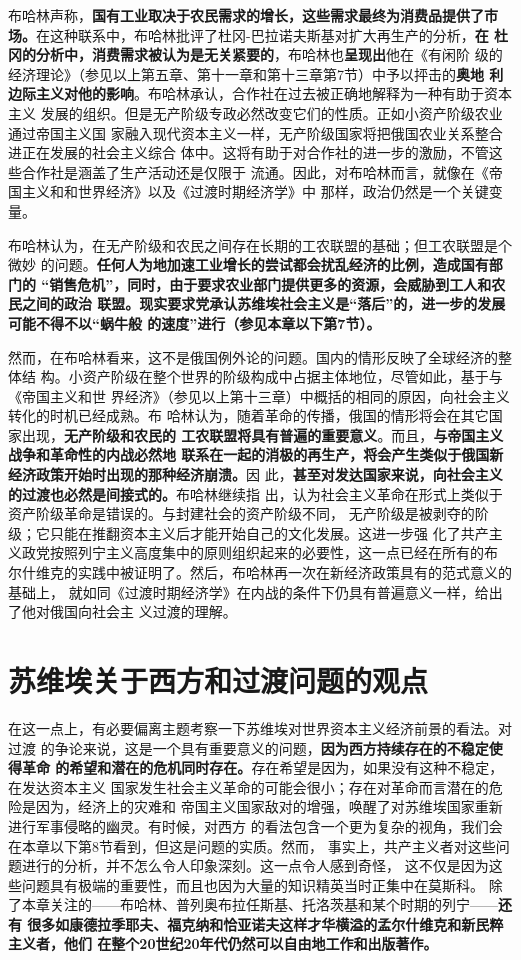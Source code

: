 布哈林声称，\textbf{国有工业取决于农民需求的增长，这些需求最终为消费品提供了市
  场。}在这种联系中，布哈林批评了杜冈-巴拉诺夫斯基对扩大再生产的分析，\textbf{在
  杜冈的分析中，消费需求被认为是无关紧要的}，布哈林也\textbf{呈现出}他在《有闲阶
级的经济理论》（参见以上第五章、第十一章和第十三章第7节）中予以抨击的\textbf{奥地
  利边际主义对他的影响}。布哈林承认，合作社在过去被正确地解释为一种有助于资本主义
发展的组织。但是无产阶级专政必然改变它们的性质。正如小资产阶级农业通过帝国主义国
家融入现代资本主义一样，无产阶级国家将把俄国农业关系整合进正在发展的社会主义综合
体中。这将有助于对合作社的进一步的激励，不管这些合作社是涵盖了生产活动还是仅限于
流通。因此，对布哈林而言，就像在《帝国主义和和世界经济》以及《过渡时期经济学》中
那样，政治仍然是一个关键变量。

布哈林认为，在无产阶级和农民之间存在长期的工农联盟的基础；但工农联盟是个微妙
的问题。\textbf{任何人为地加速工业增长的尝试都会扰乱经济的比例，造成国有部门的
“销售危机”，同时，由于要求农业部门提供更多的资源，会威胁到工人和农民之间的政治
联盟。现实要求党承认苏维埃社会主义是“落后”的，进一步的发展可能不得不以“蜗牛般
的速度”进行（参见本章以下第7节）。}

然而，在布哈林看来，这不是俄国例外论的问题。国内的情形反映了全球经济的整体结
构。小资产阶级在整个世界的阶级构成中占据主体地位，尽管如此，基于与《帝国主义和世
界经济》（参见以上第十三章）中概括的相同的原因，向社会主义转化的时机已经成熟。布
哈林认为，随着革命的传播，俄国的情形将会在其它国家出现，\textbf{无产阶级和农民的
工农联盟将具有普遍的重要意义}。而且，\textbf{与帝国主义战争和革命性的内战必然地
联系在一起的消极的再生产，将会产生类似于俄国新经济政策开始时出现的那种经济崩溃。}因
此，\textbf{甚至对发达国家来说，向社会主义的过渡也必然是间接式的。}布哈林继续指
出，认为社会主义革命在形式上类似于资产阶级革命是错误的。与封建社会的资产阶级不同，
无产阶级是被剥夺的阶级；它只能在推翻资本主义后才能开始自己的文化发展。这进一步强
化了共产主义政党按照列宁主义高度集中的原则组织起来的必要性，这一点已经在所有的布
尔什维克的实践中被证明了。然后，布哈林再一次在新经济政策具有的范式意义的基础上，
就如同《过渡时期经济学》在内战的条件下仍具有普遍意义一样，给出了他对俄国向社会主
义过渡的理解。

\section{苏维埃关于西方和过渡问题的观点}

在这一点上，有必要偏离主题考察一下苏维埃对世界资本主义经济前景的看法。对过渡
的争论来说，这是一个具有重要意义的问题，\textbf{因为西方持续存在的不稳定使得革命
的希望和潜在的危机同时存在。}存在希望是因为，如果没有这种不稳定，在发达资本主义
国家发生社会主义革命的可能会很小；存在对革命而言潜在的危险是因为，经济上的灾难和
帝国主义国家敌对的增强，唤醒了对苏维埃国家重新进行军事侵略的幽灵。有时候，对西方
的看法包含一个更为复杂的视角，我们会在本章以下第8节看到，但这是问题的实质。然而，
事实上，共产主义者对这些问题进行的分析，并不怎么令人印象深刻。这一点令人感到奇怪，
这不仅是因为这些问题具有极端的重要性，而且也因为大量的知识精英当时正集中在莫斯科。
除了本章关注的——布哈林、普列奥布拉任斯基、托洛茨基和某个时期的列宁——\textbf{还有
很多如康德拉季耶夫、福克纳和恰亚诺夫这样才华横溢的孟尔什维克和新民粹主义者，他们
在整个20世纪20年代仍然可以自由地工作和出版著作。}


